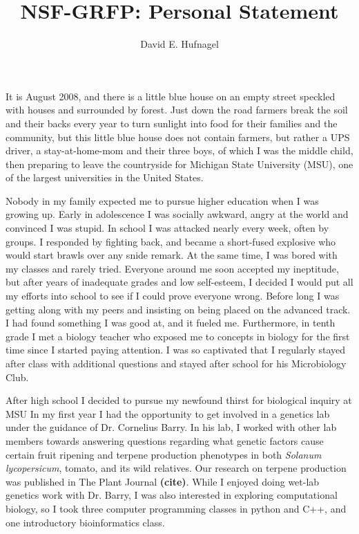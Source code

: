 \documentclass[12pt]{amsart}
\title{NSF-GRFP: Personal Statement}
\author{David E. Hufnagel}
\begin{document}
\maketitle
It is August 2008, and there is a little blue house on an empty street speckled with houses and surrounded by forest. 
Just down the road farmers break the soil and their backs every year to turn sunlight into food for their families and the community, but this little blue house does not contain farmers, but rather a UPS driver, a stay-at-home-mom and their three boys, of which I was the middle child, then preparing to leave the countryside for Michigan State University (MSU), one of the largest universities in the United States.

Nobody in my family expected me to pursue higher education when I was growing up.  
Early in adolescence I was socially awkward, angry at the world and convinced I was stupid.  
In school I was attacked nearly every week, often by groups.  
I responded by fighting back, and became a short-fused explosive who would start brawls over any snide remark.
At the same time, I was bored with my classes and rarely tried.  
Everyone around me soon accepted my ineptitude, but after years of inadequate grades and low self-esteem, I decided I would put all my efforts into school to see if I could prove everyone wrong.  
Before long I was getting along with my peers and insisting on being placed on the advanced track.  
I had found something I was good at, and it fueled me.  
Furthermore, in tenth grade I met a biology teacher who exposed me to concepts in biology for the first time since I started paying attention.  
I was so captivated that I regularly stayed after class with additional questions and stayed after school for his Microbiology Club.  

After high school I decided to pursue my newfound thirst for biological inquiry at MSU
In my first year I had the opportunity to get involved in a genetics lab under the guidance of Dr. Cornelius Barry. 
In his lab, I worked with other lab members towards answering questions regarding what genetic factors cause certain fruit ripening and terpene production phenotypes in both  \textit{Solanum lycopersicum}, tomato, and its wild relatives.  
Our research on terpene production was published in The Plant Journal \textbf{(cite)}.  
While I enjoyed doing wet-lab genetics work with Dr. Barry, I was also interested in exploring computational biology, so I took three computer programming classes in python and C++, and one introductory bioinformatics class.
\end{document}
